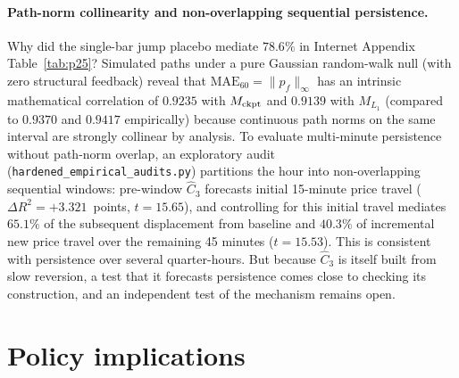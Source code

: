 \documentclass[12pt]{article}
\theoremstyle{definition}
\theoremstyle{remark}
\begin{document}
\paragraph{Path-norm collinearity and non-overlapping sequential persistence.} Why did the single-bar jump placebo mediate $78.6\%$ in Internet Appendix Table~\ref{tab:p25}? Simulated paths under a pure Gaussian random-walk null (with zero structural feedback) reveal that $\mathrm{MAE}_{60}=\|p_f\|_\infty$ has an intrinsic mathematical correlation of $0.9235$ with $M_{\rm ckpt}$ and $0.9139$ with $M_{L_1}$ (compared to $0.9370$ and $0.9417$ empirically) because continuous path norms on the same interval are strongly collinear by analysis. To evaluate multi-minute persistence without path-norm overlap, an exploratory audit (\texttt{hardened\_empirical\_audits.py}) partitions the hour into non-overlapping sequential windows: pre-window $\hat C_3$ forecasts initial 15-minute price travel ($\Delta R^2=+3.321$~points, $t=15.65$), and controlling for this initial travel mediates $65.1\%$ of the subsequent displacement from baseline and $40.3\%$ of incremental new price travel over the remaining 45 minutes ($t=15.53$). This is consistent with persistence over several quarter-hours. But because $\hat C_3$ is itself built from slow reversion, a test that it forecasts persistence comes close to checking its construction, and an independent test of the mechanism remains open.
\section{Policy implications}\label{sec:policy}
\end{document}
